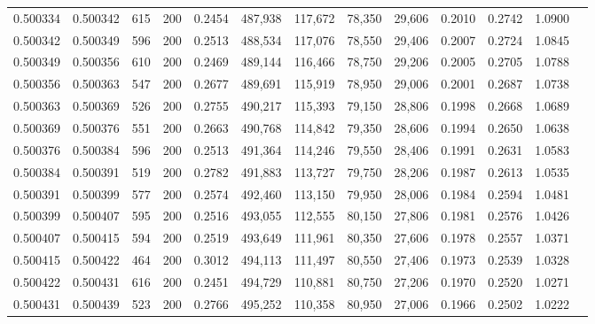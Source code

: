 \begin{tabular}{rrrrrrrrrrrrr}
0.500334 & 0.500342 &   615 & 200 &                                     0.2454 & 487,938 & 117,672 &  78,350 &  29,606 & 0.2010 & 0.2742 & 1.0900 \\
0.500342 & 0.500349 &   596 & 200 &                                     0.2513 & 488,534 & 117,076 &  78,550 &  29,406 & 0.2007 & 0.2724 & 1.0845 \\
0.500349 & 0.500356 &   610 & 200 &                                     0.2469 & 489,144 & 116,466 &  78,750 &  29,206 & 0.2005 & 0.2705 & 1.0788 \\
0.500356 & 0.500363 &   547 & 200 &                                     0.2677 & 489,691 & 115,919 &  78,950 &  29,006 & 0.2001 & 0.2687 & 1.0738 \\
0.500363 & 0.500369 &   526 & 200 &                                     0.2755 & 490,217 & 115,393 &  79,150 &  28,806 & 0.1998 & 0.2668 & 1.0689 \\
0.500369 & 0.500376 &   551 & 200 &                                     0.2663 & 490,768 & 114,842 &  79,350 &  28,606 & 0.1994 & 0.2650 & 1.0638 \\
0.500376 & 0.500384 &   596 & 200 &                                     0.2513 & 491,364 & 114,246 &  79,550 &  28,406 & 0.1991 & 0.2631 & 1.0583 \\
0.500384 & 0.500391 &   519 & 200 &                                     0.2782 & 491,883 & 113,727 &  79,750 &  28,206 & 0.1987 & 0.2613 & 1.0535 \\
0.500391 & 0.500399 &   577 & 200 &                                     0.2574 & 492,460 & 113,150 &  79,950 &  28,006 & 0.1984 & 0.2594 & 1.0481 \\
0.500399 & 0.500407 &   595 & 200 &                                     0.2516 & 493,055 & 112,555 &  80,150 &  27,806 & 0.1981 & 0.2576 & 1.0426 \\
0.500407 & 0.500415 &   594 & 200 &                                     0.2519 & 493,649 & 111,961 &  80,350 &  27,606 & 0.1978 & 0.2557 & 1.0371 \\
0.500415 & 0.500422 &   464 & 200 &                                     0.3012 & 494,113 & 111,497 &  80,550 &  27,406 & 0.1973 & 0.2539 & 1.0328 \\
0.500422 & 0.500431 &   616 & 200 &                                     0.2451 & 494,729 & 110,881 &  80,750 &  27,206 & 0.1970 & 0.2520 & 1.0271 \\
0.500431 & 0.500439 &   523 & 200 &                                     0.2766 & 495,252 & 110,358 &  80,950 &  27,006 & 0.1966 & 0.2502 & 1.0222 \\

\end{tabular}

